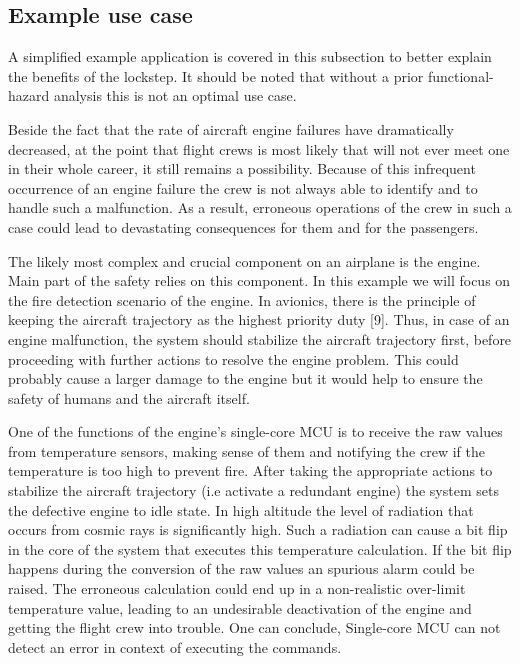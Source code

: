 \subsection{Example use case \citep{lockstep_analysis}}

A simplified example application is covered in this subsection to better explain the benefits of the lockstep. It should be noted that without a prior functional-hazard analysis this is not an optimal use case.

Beside the fact that the rate of aircraft engine failures have dramatically decreased,
at the point that flight crews is most likely that will not ever meet one in their
whole career, it still remains a possibility. Because of this infrequent occurrence
of an engine failure the crew is not always able to identify and to handle such a
malfunction. As a result, erroneous operations of the crew in such a case could
lead to devastating consequences for them and for the passengers.

The likely most complex and crucial component on an airplane is the engine. Main part of the safety relies on this component. In this example we will focus on the fire detection scenario of the engine. 
In avionics, there is the principle of keeping the aircraft trajectory as
the highest priority duty [9]. Thus, in case of an engine malfunction, the system
should stabilize the aircraft trajectory first, before proceeding with further actions
to resolve the engine problem. This could probably cause a larger damage to the
engine but it would help to ensure the safety of humans and the aircraft itself.

One of the functions of the engine's single-core MCU is to receive the raw values from temperature sensors, making sense of them and notifying the crew if the temperature is too high to prevent fire.  
After taking the appropriate actions to stabilize the aircraft trajectory (i.e activate a redundant engine) the system sets the defective engine to idle state. In high
altitude the level of radiation that occurs from cosmic rays is significantly high.
Such a radiation can cause a bit flip in the core of the
system that executes this temperature calculation. If the bit flip happens during the conversion of the raw values an spurious alarm could be raised. The erroneous calculation could end up in a non-realistic
over-limit temperature value, leading to an undesirable deactivation of the engine
and getting the flight crew into trouble. One can conclude, Single-core MCU can not detect an error in context of executing the commands.

